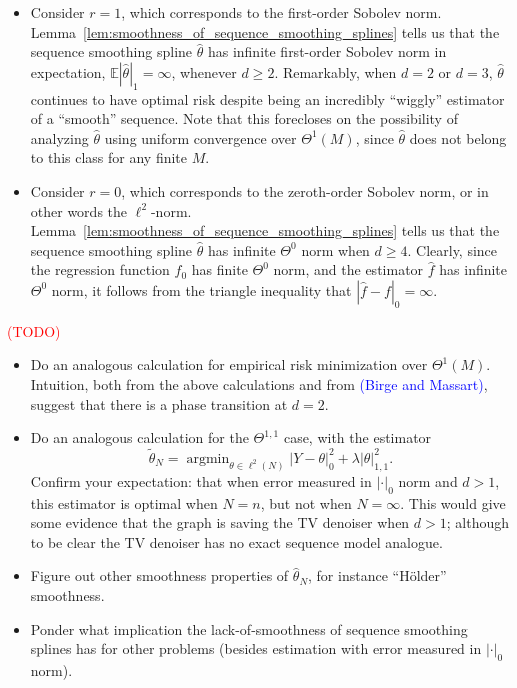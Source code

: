 \documentclass{article}
\newcommand{\1}{\mathbf{1}}
\DeclareMathOperator*{\argmin}{argmin}
\newcommand{\Ebb}{\mathbb{E}}
\newcommand{\wt}[1]{\widetilde{#1}}
\newcommand{\wh}[1]{\widehat{#1}}
\theoremstyle{alden}
\theoremstyle{aldenthm}
\theoremstyle{definition}
\theoremstyle{remark}
\begin{document}
\begin{itemize}
	\item Consider $r = 1$, which corresponds to the first-order Sobolev norm. Lemma~\ref{lem:smoothness_of_sequence_smoothing_splines} tells us that the sequence smoothing spline $\wh{\theta}$ has infinite first-order Sobolev norm in expectation, $\Ebb|\wh{\theta}|_1 = \infty$, whenever $d \geq 2$. Remarkably, when $d = 2$ or $d = 3$, $\wh{\theta}$ continues to have optimal risk despite being an incredibly ``wiggly'' estimator of a ``smooth'' sequence. Note that this forecloses on the possibility of analyzing $\wh{\theta}$ using uniform convergence over $\Theta^1(M)$, since $\wh{\theta}$ does not belong to this class for any finite $M$.
	\item Consider $r = 0$, which corresponds to the zeroth-order Sobolev norm, or in other words the $\ell^2$-norm. Lemma~\ref{lem:smoothness_of_sequence_smoothing_splines} tells us that the sequence smoothing spline $\wh{\theta}$ has infinite $\Theta^0$ norm when $d \geq 4$. Clearly, since the regression function $f_0$ has finite $\Theta^0$ norm, and the estimator $\wh{f}$ has infinite $\Theta^0$ norm, it follows from the triangle inequality that $|\wh{f} - f|_0 = \infty$. 
\end{itemize}

\textcolor{red}{(TODO)}
\begin{itemize}
	\item Do an analogous calculation for empirical risk minimization over $\Theta^1(M)$. Intuition, both from the above calculations and from \textcolor{blue}{(Birge and Massart)}, suggest that there is a phase transition at $d = 2$.  
	\item Do an analogous calculation for the $\Theta^{1,1}$ case, with the estimator
	\begin{equation*}
	\wt{\theta}_{N} = \argmin_{\theta \in \ell^2(N)} |Y - \theta|_0^2 + \lambda |\theta|_{1,1}^2.
	\end{equation*}
	Confirm your expectation: that when error measured in $|\cdot|_0$ norm and $d > 1$, this estimator is optimal when $N = n$, but not when $N = \infty$. This would give some evidence that the graph is saving the TV denoiser when $d > 1$; although to be clear the TV denoiser has no exact sequence model analogue.
	\item Figure out other smoothness properties of $\wh{\theta}_N$, for instance ``H\"{o}lder'' smoothness.
	\item Ponder what implication the lack-of-smoothness of sequence smoothing splines has for other problems (besides estimation with error measured in $|\cdot|_0$ norm).
\end{itemize}
\end{document}
